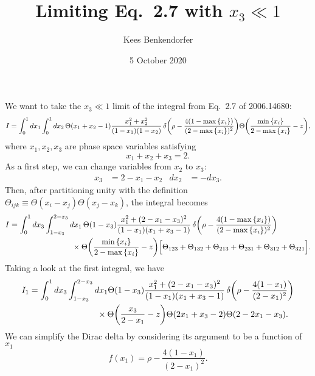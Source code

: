 \documentclass[11pt,twoside,reqno]{amsart}
\title{Limiting Eq.\ 2.7 with $x_3 \ll 1$}
\author{Kees Benkendorfer}
\date{5 October 2020}
\theoremstyle{plain}
\theoremstyle{remark}
\theoremstyle{definition}
\theoremstyle{remark}
\theoremstyle{definition}
\theoremstyle{definition}
\begin{document}
\maketitle

We want to take the $x_3 \ll 1$ limit of the integral from Eq.\ 2.7 of 2006.14680:
\begin{equation}
	I = \int_0^1 dx_1 \int_0^1 dx_2 \, \Theta(x_1 + x_2 - 1) \frac{x_1^2 + x_2^2}{(1 - x_1)(1 - x_2)} \, \delta \qty(\rho - \frac{4(1 - \max\qty{x_i})}{(2 - \max\qty{x_i})^2}) \Theta\qty(\frac{\min\qty{x_i}}{2 - \max\qty{x_i}} - z),
\end{equation}
where $x_1, x_2, x_3$ are phase space variables satisfying
\begin{equation}
	x_1 + x_2 + x_3 = 2.
\end{equation}
As a first step, we can change variables from $x_2$ to $x_3$:
\begin{align}
	x_3 &= 2 - x_1 - x_2 & dx_2 &= -dx_3.
\end{align}
Then, after partitioning unity with the definition $\Theta_{ijk} \equiv \Theta(x_i - x_j)\Theta(x_j - x_k)$, the integral becomes
\begin{equation}
\begin{aligned}
	I &= \int_0^1 dx_3 \int_{1 - x_3}^{2 - x_3} dx_1 \, \Theta(1 - x_3) \frac{x_1^2 + (2 - x_1 - x_3)^2}{(1 - x_1)(x_1 + x_3 - 1)} \, \delta \qty(\rho - \frac{4(1 - \max\qty{x_i})}{(2 - \max\qty{x_i})^2}) \\
	&\qquad\qquad\qquad\qquad \times \Theta\qty(\frac{\min\qty{x_i}}{2 - \max\qty{x_i}} - z) \Big[ \Theta_{123} + \Theta_{132} + \Theta_{213} + \Theta_{231} + \Theta_{312} + \Theta_{321} \Big].
\end{aligned}
\end{equation}
Taking a look at the first integral, we have
\begin{equation}
\begin{aligned}
	I_1 &= \int_0^1 dx_3 \int_{1 - x_3}^{2 - x_3} dx_1 \Theta(1 - x_3) \frac{x_1^2 + (2 - x_1 - x_3)^2}{(1 - x_1)(x_1 + x_3 - 1)} \, \delta \qty(\rho - \frac{4(1 - x_1)}{(2 - x_1)^2}) \\
		&\qquad\qquad\qquad\qquad \times \Theta\qty(\frac{x_3}{2 - x_1} - z) \Theta(2x_1 + x_3 - 2)\Theta(2 - 2x_1 - x_3).
\end{aligned}
\end{equation}
We can simplify the Dirac delta by considering its argument to be a function of $x_1$
\begin{equation}
	f(x_1) = \rho - \frac{4(1 - x_1)}{(2 - x_1)^2}.
\end{equation}
\end{document}
